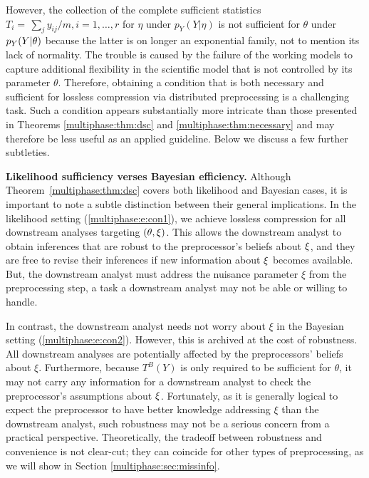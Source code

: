 However,  the collection of the complete sufficient statistics $T_i =  \, \sum_j y_{ij}/m, i=1, \ldots, r$ for  $\eta$ under $p_Y(Y|\eta)$ is not sufficient for $\theta$ under $p_Y(Y | \theta)$ because the latter is on longer an exponential family, not to mention its lack of normality.
The trouble is caused by the failure of the working models to capture additional flexibility in the scientific model that is not controlled by  its parameter $\theta$.
 Therefore, obtaining a condition that is both necessary and sufficient for lossless compression via distributed preprocessing is a challenging task.
Such a condition appears substantially more intricate than those presented in Theorems \ref{multiphase:thm:dsc} and \ref{multiphase:thm:necessary} and may therefore be less useful as an applied guideline.
Below we discuss a few further subtleties.
  
\medskip
\noindent
{\bf Likelihood sufficiency verses Bayesian efficiency.}
Although Theorem~\ref{multiphase:thm:dsc} covers both likelihood and Bayesian cases, it is important to note a subtle distinction between their general implications.
 In the likelihood setting (\ref{multiphase:e:con1}), we achieve lossless compression for all downstream analyses targeting $(\theta, \xi)$.
 This allows the downstream analyst to obtain inferences that are robust to the preprocessor's beliefs about $\xi$, and they are free to revise their inferences if new information about $\xi$ becomes available.
But, the downstream analyst must address the nuisance parameter $\xi$ from the preprocessing step, a task a downstream analyst may not be able or willing to handle.

In contrast, the downstream analyst needs not worry about $\xi$ in the Bayesian setting (\ref{multiphase:e:con2}).
However, this is archived at the cost of robustness.
All downstream analyses are potentially affected by the preprocessors' beliefs about $\xi$.
Furthermore, because $T^B(Y)$ is only required to be sufficient for $\theta$,  it may not carry any information for a downstream analyst to check the preprocessor's assumptions about $\xi$.
Fortunately, as it is generally logical to expect the preprocessor to have better knowledge addressing $\xi$ than the downstream analyst, such robustness may not be a serious concern from a practical perspective.
Theoretically, the tradeoff between robustness and convenience is not clear-cut; they can coincide for other types of preprocessing, as we will show in Section \ref{multiphase:sec:missinfo}.

